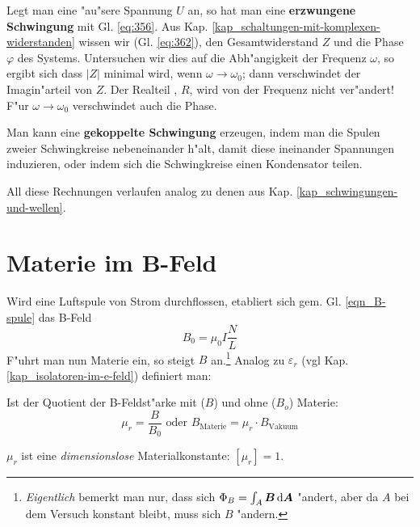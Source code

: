 %
Legt man eine "au"sere Spannung $U$ an, so hat man eine
\textbf{erzwungene Schwingung} mit Gl. \eqref{eq:356}. Aus
Kap. \ref{kap_schaltungen-mit-komplexen-widerstanden} wissen wir
(Gl. \eqref{eq:362}), den Gesamtwiderstand $Z$ und die Phase $\varphi$
des Systems. Untersuchen wir dies auf die Abh"angigkeit der Frequenz
$\omega$, so ergibt sich dass $|Z|$ minimal wird, wenn $\omega \to
\omega_0$; dann verschwindet der Imagin"arteil von $Z$. Der Realteil ,
$R$, wird von der Frequenz nicht ver"andert! F"ur $\omega \to \omega_0$
verschwindet auch die Phase.

Man kann eine \textbf{gekoppelte
  Schwingung} erzeugen, indem man die Spulen zweier Schwingkreise
nebeneinander h"alt, damit diese ineinander Spannungen induzieren, oder
indem sich die Schwingkreise einen Kondensator teilen.


\abs
All diese Rechnungen verlaufen analog zu denen aus
Kap. \ref{kap_schwingungen-und-wellen}.









\section{Materie im B-Feld}
\label{kap_materie-im-b-feld}

Wird eine Luftspule von Strom durchflossen, etabliert sich
gem. Gl. \eqref{eqn_B-spule} das B-Feld
\begin{equation*}
   B_0 = \mu_0 I \frac{N}{L}
\end{equation*}
F"uhrt man nun Materie ein, so steigt $B$
an.\footnote{\emph{Eigentlich} bemerkt man nur, dass sich $\Phi_B =
  \int_A \boldsymbol{B} \, \mathrm{d} \boldsymbol{A}$ "andert, aber da $A$ bei dem Versuch
  konstant bleibt, muss sich $B$ "andern.} Analog zu $\varepsilon_r$
(vgl Kap. \ref{kap_isolatoren-im-e-feld}) definiert man:
\begin{Def}
    Ist
   der Quotient der B-Feldst"arke mit ($B$) und ohne ($B_o$) Materie:
   \begin{equation}
      \label{eqn_def_mu_r}
      \mu_r = \frac{B}{B_0} \text{ oder } B_\text{Materie} = \mu_r
      \cdot B_\text{Vakuum}
   \end{equation}
\end{Def}
$\mu_r$ ist eine \emph{dimensionslose} Materialkonstante: $[\mu_r] =
1$.

